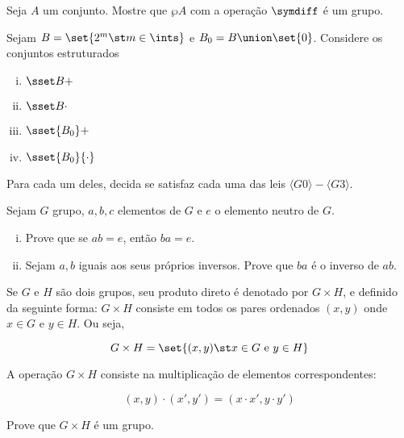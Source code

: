 \begin{exercise}
Seja $A$ um conjunto. Mostre que $\wp A$ com a operação $\symdiff$ é um grupo.
\end{exercise}

\begin{exercise}
Sejam $B = \set{2^m \st m \in \ints}$ e $B_0 = B \union \set{0}$. Considere os conjuntos estruturados

\begin{enumerate}[(i)]
    \item $\sset B +$
    \item $\sset B {\cdot}$
    \item $\sset {B_0} +$
    \item $\sset {B_0} {\cdot}$
\end{enumerate}

Para cada um deles, decida se satisfaz cada uma das leis $\langle G0 \rangle - \langle G3 \rangle$.
\end{exercise}

\begin{exercise}
Sejam $G$ grupo, $a,b,c$ elementos de $G$ e $e$ o elemento neutro de $G$.

\begin{enumerate}[(i)]
    \item Prove que se $ab = e$, então $ba = e$.
    \item Sejam $a,b$ iguais aos seus próprios inversos. Prove que $ba$ é o inverso de $ab$.
\end{enumerate}
\end{exercise}

\begin{exercise}
Se $G$ e $H$ são dois grupos, seu produto direto é denotado por $G \times H$, e definido da seguinte forma: $G \times H$ consiste em todos os pares ordenados $(x,y)$ onde $x \in G$ e $y \in H$. Ou seja,

$$
    G \times H = \set{(x,y) \st x \in G \text{ e } y \in H}
$$

A operação $G \times H$ consiste na multiplicação de elementos correspondentes:

$$
    (x,y) \cdot (x',y') = (x \cdot x', y \cdot y')
$$

Prove que $G \times H$ é um grupo.
\end{exercise}
